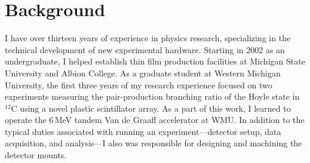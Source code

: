 \section*{Background}
I have over thirteen years of experience in physics research, specializing in the technical development of new experimental hardware.
Starting in 2002 as an undergraduate, I helped establish thin film production facilities at Michigan State University and Albion College.
As a graduate student at Western Michigan University, the first three years of my research experience focused on two experiments measuring the pair-production branching ratio of the Hoyle state in $^{12}$C using a novel plastic scintillator array.  As a part of this work, I learned to operate the 6\,MeV tandem Van de Graaff accelerator at WMU.  In addition to the typical duties associated with running an experiment---detector setup, data acquisition, and analysis---I also was responsible for designing and machining the detector mounts.%

